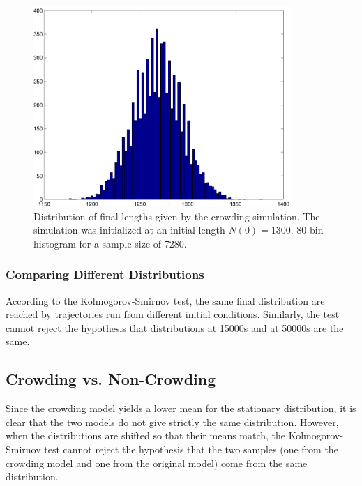 \documentclass[titlepage]{article}
\begin{document}
\begin{figure}%
\centering
\includegraphics[height=3in]{c_ic8_15Ks}
\caption{Distribution of final lengths given by the crowding simulation.
The simulation was initialized at an initial length $N(0) = 1300$.
80 bin histogram for a sample size of 7280.}
\label{fig:crowd_ic8_15Ks}
\end{figure}



\subsubsection{Comparing Different Distributions}
According to the Kolmogorov-Smirnov test, the same final distribution are reached by trajectories run from different initial conditions.
Similarly, the test cannot reject the hypothesis that distributions at 15000s and at 50000s are the same.

\subsection{Crowding vs. Non-Crowding}
Since the crowding model yields a lower mean for the stationary distribution, it is clear that the two models do not give strictly the same distribution.
However, when the distributions are shifted so that their means match, the Kolmogorov-Smirnov test cannot reject the hypothesis that the two samples (one from the crowding model and one from the original model) come from the same distribution.
\end{document}
